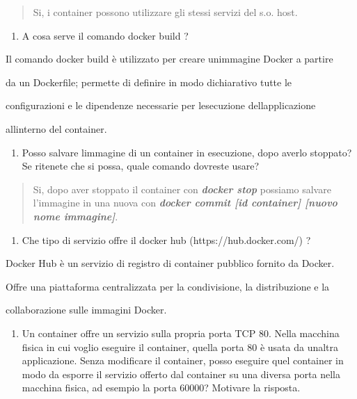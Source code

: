 \begin{quote}
Si, i container possono utilizzare gli stessi servizi del s.o. host.
\end{quote}

\begin{enumerate}
\def\labelenumi{\arabic{enumi}.}
\setcounter{enumi}{5}
\item
  A cosa serve il comando docker build ?
\end{enumerate}

Il comando docker build è utilizzato per creare
un\textquotesingle immagine Docker a partire

da un Dockerfile; permette di definire in modo dichiarativo tutte le

configurazioni e le dipendenze necessarie per
l\textquotesingle esecuzione dell\textquotesingle applicazione

all\textquotesingle interno del container.

\begin{enumerate}
\def\labelenumi{\arabic{enumi}.}
\setcounter{enumi}{6}
\item
  Posso salvare l\textquotesingle immagine di un container in
  esecuzione, dopo averlo stoppato? Se ritenete che si possa, quale
  comando dovreste usare?
\end{enumerate}

\begin{quote}
Si, dopo aver stoppato il container con \emph{\textbf{docker stop}}
possiamo salvare l'immagine in una nuova con \emph{\textbf{docker commit
{[}id container{]} {[}nuovo nome immagine{]}}}.
\end{quote}

\begin{enumerate}
\def\labelenumi{\arabic{enumi}.}
\setcounter{enumi}{7}
\item
  Che tipo di servizio offre il docker hub (https://hub.docker.com/) ?
\end{enumerate}

Docker Hub è un servizio di registro di container pubblico fornito da
Docker.

Offre una piattaforma centralizzata per la condivisione, la
distribuzione e la

collaborazione sulle immagini Docker.

\begin{enumerate}
\def\labelenumi{\arabic{enumi}.}
\setcounter{enumi}{8}
\item
  Un container offre un servizio sulla propria porta TCP 80. Nella
  macchina fisica in cui voglio eseguire il container, quella porta 80 è
  usata da un\textquotesingle altra applicazione. Senza modificare il
  container, posso eseguire quel container in modo da esporre il
  servizio offerto dal container su una diversa porta nella macchina
  fisica, ad esempio la porta 60000? Motivare la risposta.
\end{enumerate}

